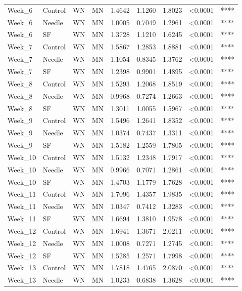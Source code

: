 \documentclass[
  12pt,
  letterpaper,
]{article}
\begin{document}
\begin{longtable}{llccrrrlc}
Week\_6 & Control & WN & MN & 1.4642 & 1.1260 & 1.8023 & <0.0001 & **** \\ 
Week\_6 & Needle & WN & MN & 1.0005 & 0.7049 & 1.2961 & <0.0001 & **** \\ 
Week\_6 & SF & WN & MN & 1.3728 & 1.1210 & 1.6245 & <0.0001 & **** \\ 
Week\_7 & Control & WN & MN & 1.5867 & 1.2853 & 1.8881 & <0.0001 & **** \\ 
Week\_7 & Needle & WN & MN & 1.1054 & 0.8345 & 1.3762 & <0.0001 & **** \\ 
Week\_7 & SF & WN & MN & 1.2398 & 0.9901 & 1.4895 & <0.0001 & **** \\ 
Week\_8 & Control & WN & MN & 1.5293 & 1.2068 & 1.8519 & <0.0001 & **** \\ 
Week\_8 & Needle & WN & MN & 0.9968 & 0.7274 & 1.2663 & <0.0001 & **** \\ 
Week\_8 & SF & WN & MN & 1.3011 & 1.0055 & 1.5967 & <0.0001 & **** \\ 
Week\_9 & Control & WN & MN & 1.5496 & 1.2641 & 1.8352 & <0.0001 & **** \\ 
Week\_9 & Needle & WN & MN & 1.0374 & 0.7437 & 1.3311 & <0.0001 & **** \\ 
Week\_9 & SF & WN & MN & 1.5182 & 1.2559 & 1.7805 & <0.0001 & **** \\ 
Week\_10 & Control & WN & MN & 1.5132 & 1.2348 & 1.7917 & <0.0001 & **** \\ 
Week\_10 & Needle & WN & MN & 0.9966 & 0.7071 & 1.2861 & <0.0001 & **** \\ 
Week\_10 & SF & WN & MN & 1.4703 & 1.1779 & 1.7628 & <0.0001 & **** \\ 
Week\_11 & Control & WN & MN & 1.7096 & 1.4357 & 1.9835 & <0.0001 & **** \\ 
Week\_11 & Needle & WN & MN & 1.0347 & 0.7412 & 1.3283 & <0.0001 & **** \\ 
Week\_11 & SF & WN & MN & 1.6694 & 1.3810 & 1.9578 & <0.0001 & **** \\ 
Week\_12 & Control & WN & MN & 1.6941 & 1.3671 & 2.0211 & <0.0001 & **** \\ 
Week\_12 & Needle & WN & MN & 1.0008 & 0.7271 & 1.2745 & <0.0001 & **** \\ 
Week\_12 & SF & WN & MN & 1.5285 & 1.2571 & 1.7998 & <0.0001 & **** \\ 
Week\_13 & Control & WN & MN & 1.7818 & 1.4765 & 2.0870 & <0.0001 & **** \\ 
Week\_13 & Needle & WN & MN & 1.0233 & 0.6838 & 1.3628 & <0.0001 & **** \\ 

\end{longtable}
\end{document}
